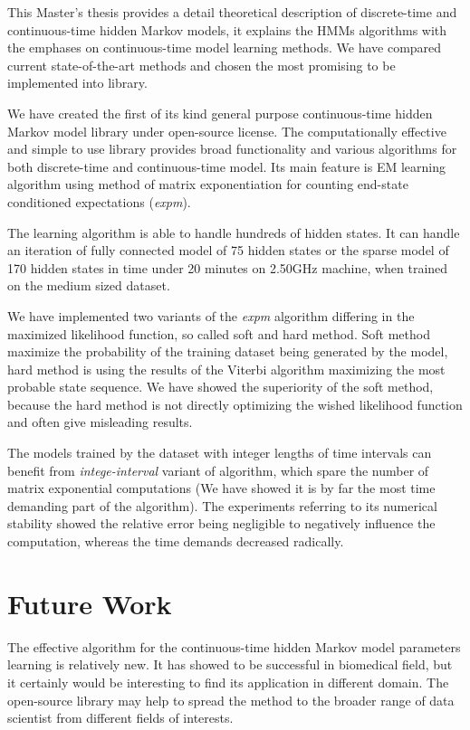 \documentclass[thesis=M,english]{FITthesis}[2012/10/20]
\begin{document}
This Master's thesis provides a detail theoretical description of discrete-time and continuous-time hidden Markov models, it explains the HMMs algorithms with the emphases on continuous-time model learning methods. We have compared current state-of-the-art methods and chosen the most promising to be implemented into library.


We have created the first of its kind general purpose continuous-time hidden Markov model library under open-source license. The computationally effective and simple to use library provides broad functionality and various algorithms for both discrete-time and continuous-time model. Its main feature is EM learning algorithm using method of matrix exponentiation for counting end-state conditioned expectations (\textit{expm}).

The learning algorithm is able to handle hundreds of hidden states. It can handle an iteration of fully connected model of 75 hidden states or the sparse model of 170 hidden states in time under 20 minutes on 2.50GHz machine, when trained on the medium sized dataset.  

We have implemented two variants of the \textit{expm} algorithm differing in the maximized likelihood function, so called soft and hard method. Soft method maximize the probability of the training dataset being generated by the model, hard method is using the results of the Viterbi algorithm maximizing the most probable state sequence. We have showed the superiority of the soft method, because the hard method is not directly optimizing the wished likelihood function and often give misleading results.

The models trained by the dataset with integer lengths of time intervals can benefit from \textit{intege-interval} variant of algorithm, which spare the number of matrix exponential computations (We have showed it is by far the most time demanding part of the algorithm). The experiments referring to its numerical stability showed the relative error being negligible to negatively influence the computation, whereas the time demands decreased radically.  

\section{Future Work}

The effective algorithm for the continuous-time hidden Markov model parameters learning is relatively new. It has showed to be successful in biomedical field, but it certainly would be interesting to find its application in different domain. The open-source library may help to spread the method to the broader range of data scientist from different fields of interests. 
\end{document}
